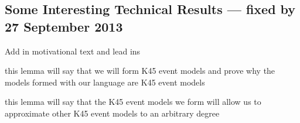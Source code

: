 \subsection{Some Interesting Technical Results --- fixed by 27 September 2013}

\FIXME Add in motivational text and lead ins

\begin{lemma}
	\FIXME this lemma will say that we will form K45 event models and prove why the models
	formed with our language are K45 event models
\end{lemma}

\begin{lemma}
	\FIXME this lemma will say that the K45 event models we form will allow us to approximate other
	K45 event models to an arbitrary degree
\end{lemma}
